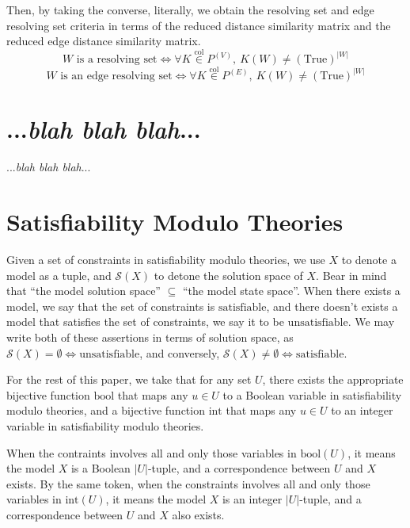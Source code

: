 \documentclass{article}
\begin{document}
Then, by taking the converse, literally, we obtain the resolving set and edge resolving set criteria in terms of the reduced distance similarity matrix and the reduced edge distance similarity matrix.
\[
	W \text{ is a resolving set} \iff \forall K \overset{\mathrm{col}}{\in} P^{(V)},\ K(W) \neq (\mathrm{True})^{|W|}
\]
\[
	W \text{ is an edge resolving set} \iff \forall K \overset{\mathrm{col}}{\in} P^{(E)},\ K(W) \neq (\mathrm{True})^{|W|}
\]

\section{...\textit{blah blah blah}...}

...\textit{blah blah blah}...

\section{Satisfiability Modulo Theories}

Given a set of constraints in satisfiability modulo theories, we use \(X\) to denote a model as a tuple, and \(\mathcal{S}(X)\) to detone the solution space of \(X\). Bear in mind that ``the model solution space'' \(\subseteq\) ``the model state space''. When there exists a model, we say that the set of constraints is \(\mathrm{satisfiable}\), and there doesn't exists a model that satisfies the set of constraints, we say it to be \(\mathrm{unsatisfiable}\). We may write both of these assertions in terms of solution space, as \(\mathcal{S}(X) = \emptyset \iff \text{unsatisfiable}\), and conversely, \(\mathcal{S}(X) \neq \emptyset \iff \text{satisfiable}\).

For the rest of this paper, we take that for any set \(U\), there exists the appropriate bijective function \(\mathrm{bool}\) that maps any \(u \in U\) to a Boolean variable in satisfiability modulo theories, and a bijective function \(\mathrm{int}\) that maps any \(u \in U\) to an integer variable in satisfiability modulo theories.

When the contraints involves all and only those variables in \(\mathrm{bool}(U)\), it means the model \(X\) is a Boolean \(|U|\)-tuple, and a correspondence between \(U\) and \(X\) exists. By the same token, when the constraints involves all and only those variables in \(\mathrm{int}(U)\), it means the model \(X\) is an integer \(|U|\)-tuple, and a correspondence between \(U\) and \(X\) also exists.
\end{document}
